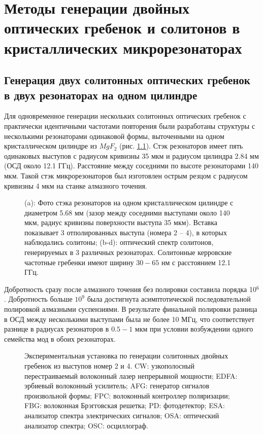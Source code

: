 \chapter{Методы генерации двойных оптических гребенок и солитонов в кристаллических микрорезонаторах} \label{chapt4}

\section{Генерация двух солитонных оптических гребенок в двух резонаторах на одном цилиндре}

Для одновременное генерации нескольких солитонных оптических гребенок \cite{Pavlov2017} с практически идентичными частотами повторения были разработаны структуры с несколькими резонаторами одинаковой формы, выточенными на одном кристаллическом цилиндре из $MgF_2$ (рис. \ref{ris:image1}). Стэк резонаторов имеет пять одинаковых выступов с радиусом кривизны 35 мкм и радиусом цилиндра 2.84 мм (ОСД около 12.1 ГГц). Расстояние между соседними по высоте резонаторами 140 мкм. Такой стэк микрорезонаторов был изготовлен острым резцом с радиусом кривизны 4 мкм на станке алмазного точения.

\begin{figure}[ht]
\begin{minipage}[ht]{1\linewidth}
\end{minipage}
\caption{ (a): Фото стэка резонаторов на одном кристаллическом цилиндре с диаметром 5.68 мм (зазор между соседними выступами около 140 мкм, радиус кривизны поверхности выступа 35 мкм). Вставка показывает 3 отполированных выступа (номера 2 -- 4), в которых наблюдались солитоны; (b-d): оптический спектр солитонов, генерируемых в 3 различных резонаторах. Солитонные керровские частотные гребенки имеют ширину $30 - 65$ нм с расстоянием 12.1 ГГц.}
\label{ris:image1}
\end{figure}

Добротность сразу после алмазного точения без полировки составила порядка 10$^6$. Добротность больше $10^9$ была достигнута асимптотической последовательной полировкой алмазными суспензиями. В результате финальной полировки разница в ОСД между несколькими выступами была не более 10 МГц, что соответствует разнице в радиусах резонаторов в $0.5 - 1$ мкм при условии возбуждении одного семейства мод в обоих резонаторах.

\begin{figure}[ht]
\begin{minipage}[ht]{1\linewidth}
\end{minipage}
\caption{Экспериментальная установка по генерации солитонных двойных гребенок из выступов номер 2 и 4. CW: узкополосный перестраиваемый волоконный лазер непрерывной мощности; EDFA: эрбиевый волоконный усилитель; AFG: генератор сигналов произвольной формы; FPC:  волоконный контроллер поляризации; FBG: волоконная Брэгговская решетка; PD: фотодетектор; ESA: анализатор спектра электрических сигналов; OSA: оптический анализатор спектра; OSC: осциллограф.}
\label{ris:image2}
\end{figure}

